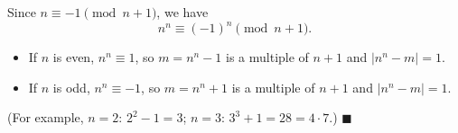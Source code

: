 Since $n\equiv-1\pmod{n+1}$, we have
\[n^n\equiv(-1)^n\pmod{n+1}.\]
\begin{itemize}
\item If $n$ is even, $n^n\equiv1$, so $m=n^n-1$ is a multiple of $n+1$ and $\left|n^n-m\right|=1$.
\item If $n$ is odd, $n^n\equiv-1$, so $m=n^n+1$ is a multiple of $n+1$ and $\left|n^n-m\right|=1$.
\end{itemize}
(For example, $n=2$: $2^2-1=3$; $n=3$: $3^3+1=28=4\cdot7$.) $\blacksquare$
